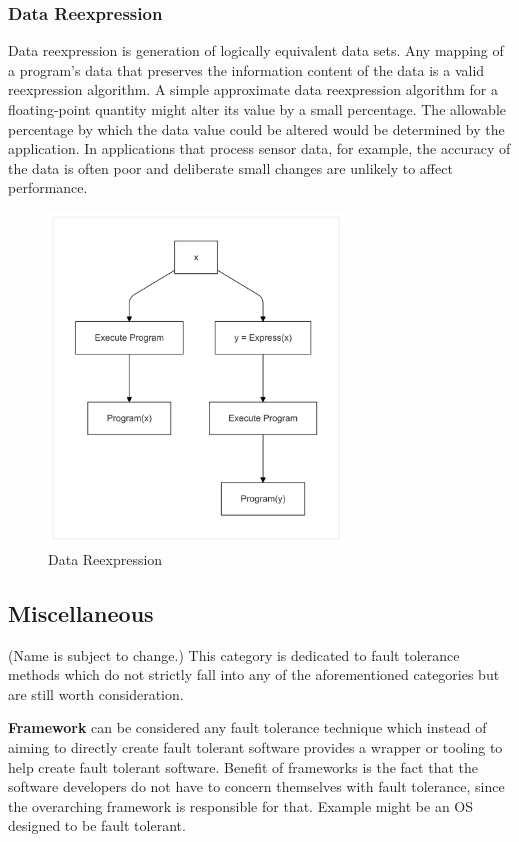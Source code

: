 \documentclass[12pt, letterpaper]{article}
\begin{document}
\subsubsection{Data Reexpression}

Data reexpression is generation of logically equivalent data sets. Any mapping of a program's data that preserves the information content of the data is a valid reexpression algorithm. A simple approximate data reexpression algorithm for a floating-point quantity might alter its value by a small percentage. The allowable percentage by which the data value could be altered would be determined by the application. In applications that process sensor data, for example, the accuracy of the data is often poor and deliberate small changes are unlikely to affect performance. \cite{nasa:datadiversity}

\begin{figure}[hbt]
    \centering
    \includegraphics[width=0.7\textwidth]{diagrams/data_div/reexpress.png}
    \caption{Data Reexpression}
    \label{fig:data_rex}
\end{figure}

\subsection{Miscellaneous}
(Name is subject to change.)
This category is dedicated to fault tolerance methods which do not strictly fall into any of the aforementioned categories but are still worth consideration.

\textbf{Framework} can be considered any fault tolerance technique which instead of aiming to directly create fault tolerant software provides a wrapper or tooling to help create fault tolerant software. Benefit of frameworks is the fact that the software developers do not have to concern themselves with fault tolerance, since the overarching framework is responsible for that. Example might be an OS designed to be fault tolerant.
\end{document}
